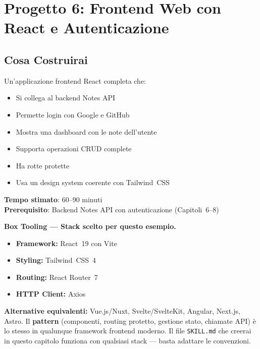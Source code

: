 \chapter{Progetto 6: Frontend Web con React e Autenticazione}

\section*{Cosa Costruirai}
Un'applicazione frontend React completa che:
\begin{itemize}
  \item Si collega al backend Notes API
  \item Permette login con Google e GitHub
  \item Mostra una dashboard con le note dell'utente
  \item Supporta operazioni CRUD complete
  \item Ha rotte protette
  \item Usa un design system coerente con Tailwind~CSS
\end{itemize}

\textbf{Tempo stimato}: 60--90 minuti\\
\textbf{Prerequisito}: Backend Notes API con autenticazione (Capitoli~6--8)

\begin{notebox}
\textbf{Box Tooling --- Stack scelto per questo esempio.}
\begin{itemize}
  \item \textbf{Framework:} React~19 con Vite
  \item \textbf{Styling:} Tailwind~CSS~4
  \item \textbf{Routing:} React Router~7
  \item \textbf{HTTP Client:} Axios
\end{itemize}
\textbf{Alternative equivalenti:} Vue.js/Nuxt, Svelte/SvelteKit, Angular, Next.js, Astro. Il \textbf{pattern} (componenti, routing protetto, gestione stato, chiamate API) \`e lo stesso in qualunque framework frontend moderno. Il file \texttt{SKILL.md} che creerai in questo capitolo funziona con qualsiasi stack --- basta adattare le convenzioni.
\end{notebox}

